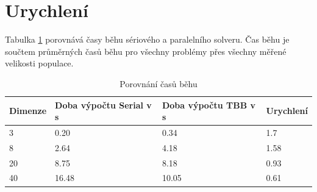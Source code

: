 \documentclass[12pt, a4paper]{report}
\begin{document}
\section{Urychlení}
Tabulka \ref{tbl:speedup} porovnává časy běhu sériového a paralelního solveru. Čas běhu je součtem průměrných časů běhu pro všechny problémy přes všechny měřené velikosti populace.

\begin{table}
	\scriptsize
	\caption{Porovnání časů běhu}
	\centering
	\label{tbl:speedup}
	\begin{tabular}{l|l|l|l}
		Dimenze & Doba výpočtu Serial v s & Doba výpočtu TBB v s & Urychlení \\
		\hline
		\hline
		3 & 0.20 & 0.34 & 1.7 \\
		8 & 2.64 & 4.18 & 1.58 \\
		20 & 8.75 & 8.18 & 0.93 \\
		40 & 16.48 & 10.05 & 0.61 \\
	\end{tabular}
\end{table}
\end{document}
